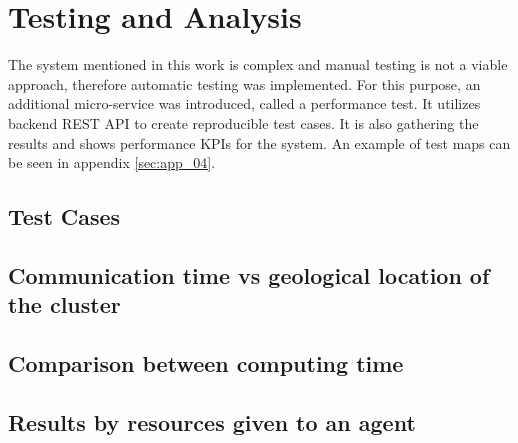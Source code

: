 \chapter{Testing and Analysis}
The system mentioned in this work is complex and manual testing is not a viable approach, therefore automatic testing was implemented. For this purpose, an additional micro-service was introduced, called a performance test. It utilizes backend REST API to create reproducible test cases. It is also gathering the results and shows performance KPIs for the system. An example of test maps can be seen in appendix \ref{sec:app_04}.

\section{Test Cases}


\section{Communication time vs geological location of the cluster}


\section{Comparison between computing time}


\section{Results by resources given to an agent}


